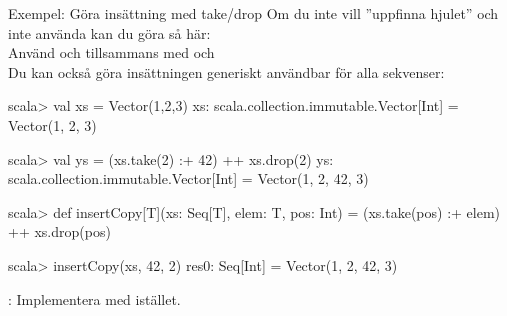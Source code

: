 \begin{Slide}{Exempel: Göra insättning med take/drop}\SlideFontSmall
Om du inte vill ''uppfinna hjulet'' och inte använda  kan du göra så här: \\Använd  och  tillsammans med \code{:+} och \code{++} \\Du kan också göra insättningen generiskt användbar för alla sekvenser:
\begin{REPLnonum}
scala> val xs = Vector(1,2,3)
xs: scala.collection.immutable.Vector[Int] = 
  Vector(1, 2, 3)

scala> val ys = (xs.take(2) :+ 42) ++ xs.drop(2)
ys: scala.collection.immutable.Vector[Int] = 
  Vector(1, 2, 42, 3)
  
scala> def insertCopy[T](xs: Seq[T], elem: T, pos: Int) = 
        (xs.take(pos) :+ elem) ++ xs.drop(pos)

scala> insertCopy(xs, 42, 2)
res0: Seq[Int] = Vector(1, 2, 42, 3)
  
\end{REPLnonum}
: Implementera  med  istället.
\end{Slide}








